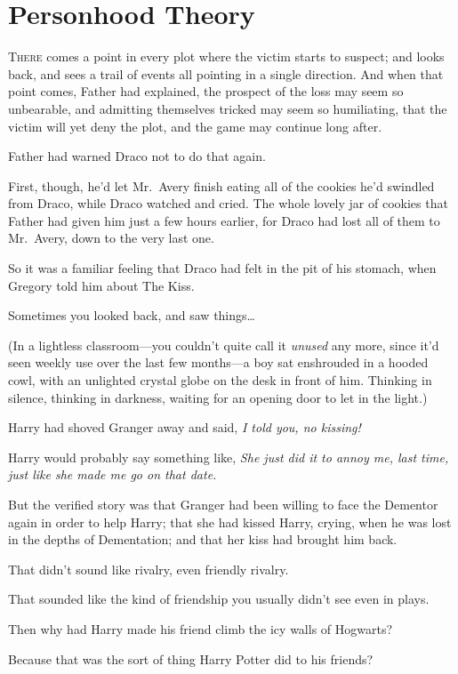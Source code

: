 \chapter{Personhood Theory}

\lettrine{T}{here} comes a 
point in every plot where the victim starts to suspect; and looks back, and 
sees a trail of events all pointing in a single direction. And when that point 
comes, Father had explained, the prospect of the loss may seem so unbearable, 
and admitting themselves tricked may seem so humiliating, that the victim will 
yet deny the plot, and the game may continue long after.

Father had warned Draco not to do that again.

First, though, he'd let Mr.~Avery finish eating all of the cookies he'd 
swindled from Draco, while Draco watched and cried. The whole lovely jar of 
cookies that Father had given him just a few hours earlier, for Draco had lost 
all of them to Mr.~Avery, down to the very last one.

So it was a familiar feeling that Draco had felt in the pit of his stomach, 
when Gregory told him about The Kiss.

Sometimes you looked back, and saw things{\ldots}

(In a lightless classroom---you couldn't quite call it \emph{unused} any more, 
since it'd seen weekly use over the last few months---a boy sat enshrouded in a 
hooded cowl, with an unlighted crystal globe on the desk in front of him. 
Thinking in silence, thinking in darkness, waiting for an opening door to let 
in the light.)

Harry had shoved Granger away and said, \emph{I told you, no kissing!}

Harry would probably say something like, \emph{She just did it to annoy me, 
last time, just like she made me go on that date.}

But the verified story was that Granger had been willing to face the Dementor 
again in order to help Harry; that she had kissed Harry, crying, when he was 
lost in the depths of Dementation; and that her kiss had brought him back.

That didn't sound like rivalry, even friendly rivalry.

That sounded like the kind of friendship you usually didn't see even in plays.

Then why had Harry made his friend climb the icy walls of Hogwarts?

Because that was the sort of thing Harry Potter did to his friends?

